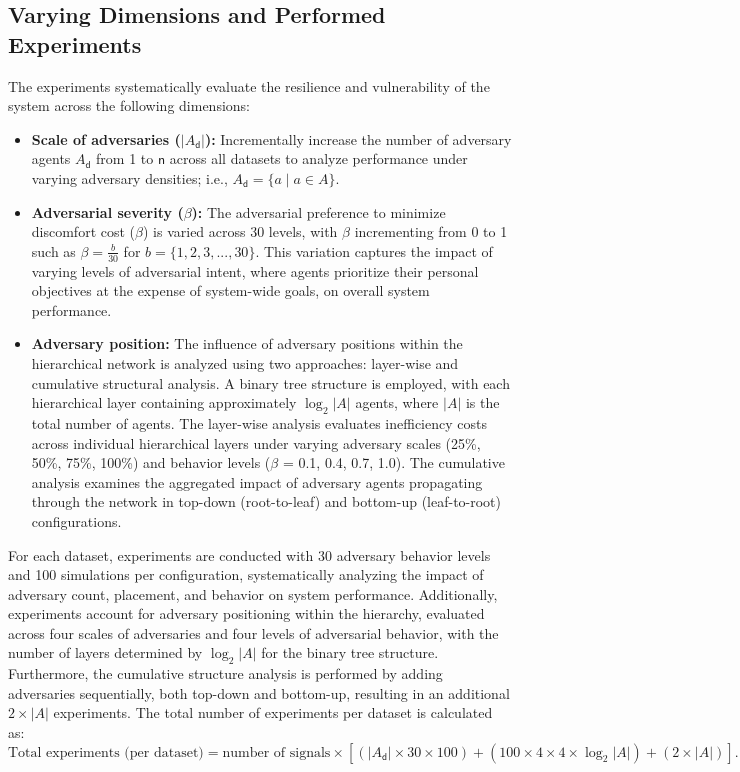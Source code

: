 \documentclass[journal]{IEEEtran}
\newcommand{\Agents}{\ensuremath{A }}
\newcommand{\NumAgents}{\ensuremath{\mathsf{n}}}
\newcommand{\AdversaryAgents}{\ensuremath{A_\mathsf{d}}}
\begin{document}
\subsection{Varying Dimensions and Performed Experiments}
The experiments systematically evaluate the resilience and vulnerability of the system across the following dimensions:
\begin{itemize}
\item \textbf{Scale of adversaries ($|\AdversaryAgents|$):} Incrementally increase the number of adversary agents \AdversaryAgents{} from 1 to \NumAgents{} across all datasets to analyze performance under varying adversary densities; i.e., $\AdversaryAgents=\{ a \mid a \in \Agents\}$.

\item \textbf{Adversarial severity ($\beta$):} The adversarial preference to minimize discomfort cost (\(\beta\)) is varied across 30 levels, with $\beta$ incrementing from 0 to 1 such as $\beta = \frac{b}{30}$ for $b = \{1, 2, 3, ..., 30\}$. This variation captures the impact of varying levels of adversarial intent, where agents prioritize their personal objectives at the expense of system-wide goals, on overall system performance.

\item \textbf{Adversary position:} The influence of adversary positions within the hierarchical network is analyzed using two approaches: layer-wise and cumulative structural analysis. A binary tree structure is employed, with each hierarchical layer containing approximately $\log_2 |A|$ agents, where $|A|$ is the total number of agents. The layer-wise analysis evaluates inefficiency costs across individual hierarchical layers under varying adversary scales (25\%, 50\%, 75\%, 100\%) and behavior levels ($\beta$ = 0.1, 0.4, 0.7, 1.0). The cumulative analysis examines the aggregated impact of adversary agents propagating through the network in top-down (root-to-leaf) and bottom-up (leaf-to-root) configurations.
\end{itemize}

For each dataset, experiments are conducted with 30 adversary behavior levels and 100 simulations per configuration, systematically analyzing the impact of adversary count, placement, and behavior on system performance. Additionally, experiments account for adversary positioning within the hierarchy, evaluated across four scales of adversaries and four levels of adversarial behavior, with the number of layers determined by $\log_2 |A|$ for the binary tree structure. Furthermore, the cumulative structure analysis is performed by adding adversaries sequentially, both top-down and bottom-up, resulting in an additional $2 \times |A|$ experiments. The total number of experiments per dataset is calculated as: $\text{Total experiments (per dataset)} = \text{number of signals} \times \left[(|\AdversaryAgents| \times 30 \times 100) + (100 \times 4 \times 4 \times \log_2 |A|) + (2 \times |A|)\right].$
\end{document}
